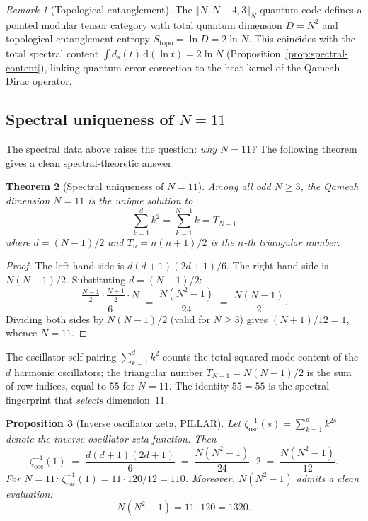 \documentclass[aps,prd,twocolumn,superscriptaddress,floatfix,nofootinbib]{revtex4-2}
\newtheorem{theorem}{Theorem}
\newtheorem{proposition}[theorem]{Proposition}
\theoremstyle{definition}
\theoremstyle{remark}
\newtheorem{remark}[theorem]{Remark}
\begin{document}
\begin{remark}[Topological entanglement]
\label{rem:mtc-topo-entanglement}
The $\llbracket N, N{-}4, 3 \rrbracket_N$ quantum code defines a pointed
modular tensor category with total quantum dimension $D = N^2$ and
topological entanglement entropy $S_{\mathrm{topo}} = \ln D = 2\ln N$.
This coincides with the total spectral content
$\int d_s(t)\,\mathrm{d}(\ln t) = 2\ln N$ (Proposition~\ref{prop:spectral-content}),
linking quantum error correction to the heat kernel of the Qameah Dirac operator.
\end{remark}

\subsection{Spectral uniqueness of $N=11$}
\label{sec:spectral-uniqueness}

The spectral data above raises the question: \emph{why $N=11$?}
The following theorem gives a clean spectral-theoretic answer.

\begin{theorem}[Spectral uniqueness of $N=11$]
\label{thm:n11unique}
Among all odd $N \geq 3$, the Qameah dimension $N=11$ is the unique solution to
\begin{equation}
\label{eq:self-pairing}
\sum_{k=1}^{d} k^2 = \sum_{k=1}^{N-1} k = T_{N-1}
\end{equation}
where $d = (N-1)/2$ and $T_n = n(n+1)/2$ is the $n$-th triangular number.
\end{theorem}

\begin{proof}
The left-hand side is $d(d+1)(2d+1)/6$.  The right-hand side is $N(N-1)/2$.
Substituting $d = (N-1)/2$:
\[
  \frac{\frac{N-1}{2}\cdot\frac{N+1}{2}\cdot N}{6}
  \;=\; \frac{N(N^2-1)}{24}
  \;=\; \frac{N(N-1)}{2}.
\]
Dividing both sides by $N(N-1)/2$ (valid for $N \geq 3$) gives
$(N+1)/12 = 1$, whence $N = 11$.
\end{proof}

The oscillator self-pairing $\sum_{k=1}^{d} k^2$ counts the total
squared-mode content of the $d$ harmonic oscillators; the triangular
number $T_{N-1} = N(N-1)/2$ is the sum of row indices, equal to $55$
for $N=11$.  The identity $55 = 55$ is the spectral fingerprint
that \emph{selects} dimension~$11$.

\begin{proposition}[Inverse oscillator zeta, PILLAR]
\label{prop:inv-zeta-osc}
Let $\zeta_{\mathrm{osc}}^{-1}(s) = \sum_{k=1}^{d} k^{2s}$ denote the
inverse oscillator zeta function.  Then
\[
  \zeta_{\mathrm{osc}}^{-1}(1) \;=\; \frac{d(d+1)(2d+1)}{6}
  \;=\; \frac{N(N^2-1)}{24} \cdot 2
  \;=\; \frac{N(N^2-1)}{12}.
\]
For $N=11$: $\zeta_{\mathrm{osc}}^{-1}(1) = 11 \cdot 120/12 = 110$.
Moreover, $N(N^2-1)$ admits a clean evaluation:
\[
  N(N^2-1) = 11 \cdot 120 = 1320.
\]
\end{proposition}
\end{document}
